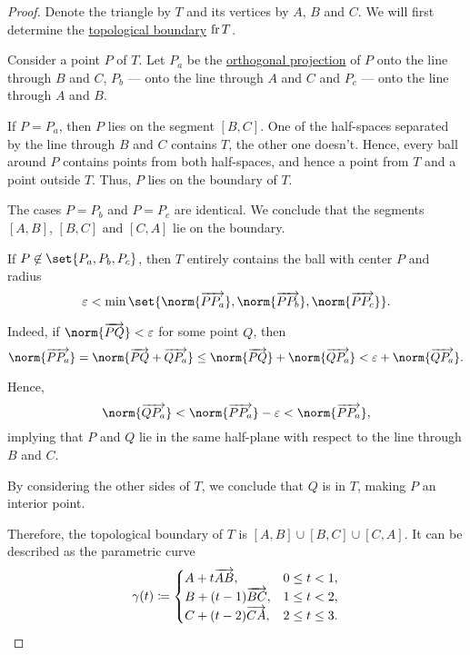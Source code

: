 \begin{proof}
  Denote the triangle by \( T \) and its vertices by \( A \), \( B \) and \( C \). We will first determine the \hyperref[def:topological_boundary]{topological boundary} \( \operatorname{fr} T \).

  Consider a point \( P \) of \( T \). Let \( P_a \) be the \hyperref[def:orthogonal_projection]{orthogonal projection} of \( P \) onto the line through \( B \) and \( C \), \( P_b \) --- onto the line through \( A \) and \( C \) and \( P_c \) --- onto the line through \( A \) and \( B \).

  If \( P = P_a \), then \( P \) lies on the segment \( [B, C] \). One of the half-spaces separated by the line through \( B \) and \( C \) contains \( T \), the other one doesn't. Hence, every ball around \( P \) contains points from both half-spaces, and hence a point from \( T \) and a point outside \( T \). Thus, \( P \) lies on the boundary of \( T \).

  The cases \( P = P_b \) and \( P = P_c \) are identical. We conclude that the segments \( [A, B] \), \( [B, C] \) and \( [C, A] \) lie on the boundary.

  If \( P \not\in \set{ P_a, P_b, P_c } \), then \( T \) entirely contains the ball with center \( P \) and radius
  \begin{equation*}
    \varepsilon < \min\set{ \norm{\vect{P P_a}}, \norm{\vect{P P_b}}, \norm{\vect{P P_c}} }.
  \end{equation*}

  Indeed, if \( \norm{\vect{PQ}} < \varepsilon \) for some point \( Q \), then
  \begin{equation*}
    \norm{\vect{P P_a}}
    =
    \norm{\vect{P Q} + \vect{Q P_a}}
    \leq
    \norm{\vect{P Q}} + \norm{\vect{Q P_a}}
    <
    \varepsilon + \norm{\vect{Q P_a}}.
  \end{equation*}

  Hence,
  \begin{equation*}
    \norm{\vect{Q P_a}} < \norm{\vect{P P_a}} - \varepsilon < \norm{\vect{P P_a}},
  \end{equation*}
  implying that \( P \) and \( Q \) lie in the same half-plane with respect to the line through \( B \) and \( C \).

  By considering the other sides of \( T \), we conclude that \( Q \) is in \( T \), making \( P \) an interior point.

  Therefore, the topological boundary of \( T \) is \( [A, B] \cup [B, C] \cup [C, A] \). It can be described as the parametric curve
  \begin{equation*}
    \gamma(t) \coloneqq \begin{cases}
      A + t \overrightarrow{AB},       &0 \leq t < 1, \\
      B + (t - 1) \overrightarrow{BC}, &1 \leq t < 2, \\
      C + (t - 2) \overrightarrow{CA}, &2 \leq t \leq 3.
    \end{cases}
  \end{equation*}


\end{proof}
